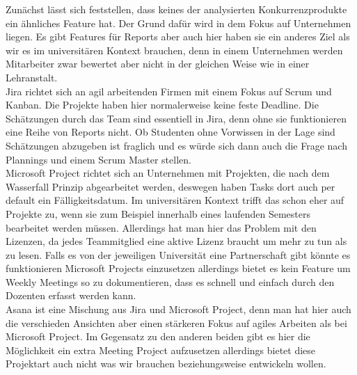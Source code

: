 Zunächst lässt sich feststellen, dass keines der analysierten Konkurrenzprodukte ein ähnliches Feature hat. Der Grund dafür wird in dem Fokus auf Unternehmen liegen. Es gibt Features für Reports aber auch hier haben sie ein anderes Ziel als wir es im universitären Kontext brauchen, denn in einem Unternehmen werden Mitarbeiter zwar bewertet aber nicht in der gleichen Weise wie in einer Lehranstalt.\\
Jira richtet sich an agil arbeitenden Firmen mit einem Fokus auf Scrum und Kanban. Die Projekte haben hier normalerweise keine feste Deadline. Die Schätzungen durch das Team sind essentiell in Jira, denn ohne sie funktionieren eine Reihe von Reports nicht. Ob Studenten ohne Vorwissen in der Lage sind Schätzungen abzugeben ist fraglich und es würde sich dann auch die Frage 
nach Plannings und einem Scrum Master stellen.\\
Microsoft Project richtet sich an Unternehmen mit Projekten, die nach dem Wasserfall Prinzip abgearbeitet werden, deswegen haben Tasks dort auch per default ein Fälligkeitsdatum. Im universitären Kontext trifft das schon eher auf Projekte zu, wenn sie zum Beispiel innerhalb eines laufenden Semesters bearbeitet werden müssen.  Allerdings hat man hier das Problem mit den Lizenzen, da jedes Teammitglied eine aktive Lizenz braucht um mehr zu tun als zu lesen. Falls es von der jeweiligen Universität eine Partnerschaft gibt könnte es funktionieren Microsoft Projects einzusetzen allerdings bietet es kein Feature um Weekly Meetings so zu dokumentieren, dass es schnell und einfach durch den Dozenten erfasst werden kann.\\
Asana ist eine Mischung aus Jira und Microsoft Project, denn man hat hier auch die verschieden Ansichten aber einen stärkeren Fokus auf agiles Arbeiten als bei Microsoft Project. Im Gegensatz zu den anderen beiden gibt es hier die Möglichkeit ein extra Meeting Project aufzusetzen allerdings bietet diese Projektart auch nicht was wir brauchen beziehungsweise entwickeln wollen. 

\clearpage
